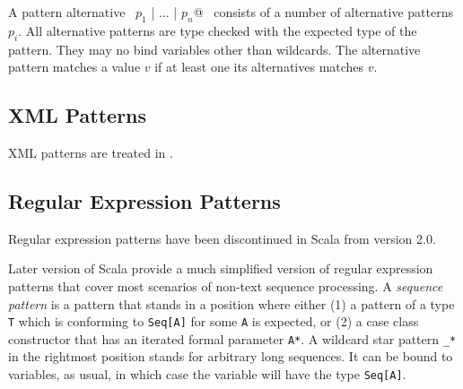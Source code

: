 A pattern alternative ~\lstinline@$p_1$ | $\ldots$ | $p_n$@~
consists of a number of alternative patterns $p_i$. All alternative
patterns are type checked with the expected type of the pattern. They
may no bind variables other than wildcards. The alternative pattern 
matches a value $v$ if at least one its alternatives matches $v$.

\subsection{XML Patterns}

XML patterns are treated in .

\subsection{Regular Expression Patterns}\label{sec:reg-pats}

Regular expression patterns have been discontinued in Scala from version 2.0.

Later version of Scala provide a much simplified version of regular
expression patterns that cover most scenarios of non-text sequence
processing.  A {\em sequence pattern} is a pattern that stands in a
position where either (1) a pattern of a type \lstinline+T+ which is
conforming to
\lstinline+Seq[A]+ for some \lstinline+A+ is expected, or (2) a case
class constructor that has an iterated formal parameter
\lstinline+A*+.  A wildcard star pattern \lstinline+_*+ in the
rightmost position stands for arbitrary long sequences. It can be
bound to variables, as usual, in which case the variable will have the
type \lstinline+Seq[A]+.

